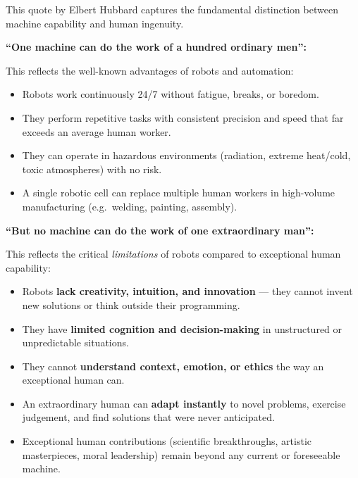 \documentclass[12pt,a3paper]{article}
\begin{document}
\begin{enumerate}
\begin{tcolorbox}[enhanced,breakable,ansbox,colback=cA!4,colframe=cA,
  boxrule=0.8pt,arc=5pt,
  title={\textbf{Answer}},fonttitle=\bfseries\color{white},colbacktitle=cA]

This quote by Elbert Hubbard captures the fundamental distinction between
machine capability and human ingenuity.

\textbf{``One machine can do the work of a hundred ordinary men'':}

This reflects the well-known advantages of robots and automation:
\begin{itemize}[leftmargin=1.5em,itemsep=1pt]
  \item Robots work continuously 24/7 without fatigue, breaks, or boredom.
  \item They perform repetitive tasks with consistent precision and speed that
        far exceeds an average human worker.
  \item They can operate in hazardous environments (radiation, extreme heat/cold,
        toxic atmospheres) with no risk.
  \item A single robotic cell can replace multiple human workers in
        high-volume manufacturing (e.g.\ welding, painting, assembly).
\end{itemize}

\textbf{``But no machine can do the work of one extraordinary man'':}

This reflects the critical \emph{limitations} of robots compared to
exceptional human capability:
\begin{itemize}[leftmargin=1.5em,itemsep=1pt]
  \item Robots \textbf{lack creativity, intuition, and innovation} — they
        cannot invent new solutions or think outside their programming.
  \item They have \textbf{limited cognition and decision-making} in
        unstructured or unpredictable situations.
  \item They cannot \textbf{understand context, emotion, or ethics} the way
        an exceptional human can.
  \item An extraordinary human can \textbf{adapt instantly} to novel problems,
        exercise judgement, and find solutions that were never anticipated.
  \item Exceptional human contributions (scientific breakthroughs, artistic
        masterpieces, moral leadership) remain beyond any current or foreseeable
        machine.
\end{itemize}


\end{tcolorbox}
\end{enumerate}
\end{document}
